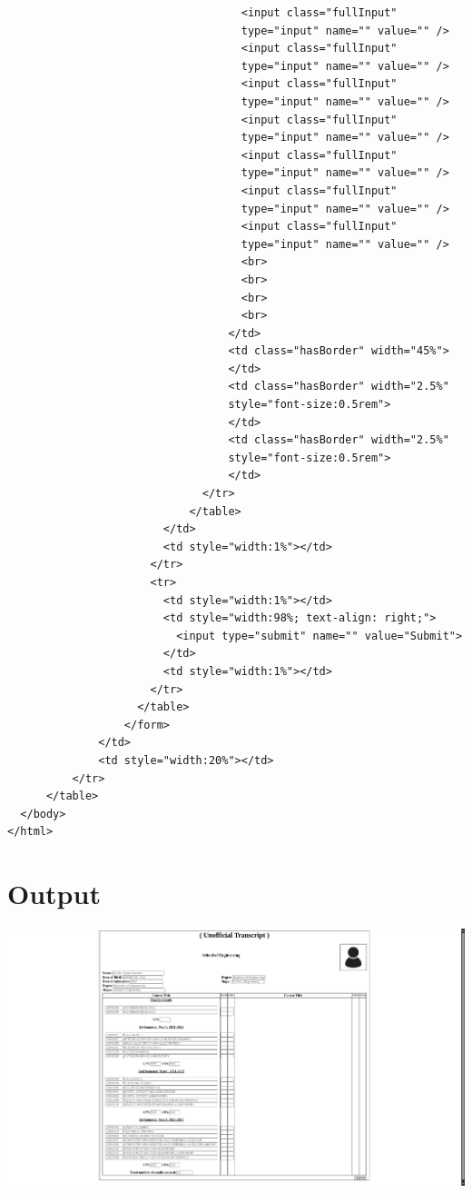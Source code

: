 \documentclass[12pt]{report} %
\begin{document}
\begin{verbatim}
                                    <input class="fullInput"
                                    type="input" name="" value="" />
                                    <input class="fullInput"
                                    type="input" name="" value="" />
                                    <input class="fullInput"
                                    type="input" name="" value="" />
                                    <input class="fullInput"
                                    type="input" name="" value="" />
                                    <input class="fullInput"
                                    type="input" name="" value="" />
                                    <input class="fullInput"
                                    type="input" name="" value="" />
                                    <input class="fullInput"
                                    type="input" name="" value="" />
                                    <br>
                                    <br>
                                    <br>
                                    <br>
                                  </td>
                                  <td class="hasBorder" width="45%">
                                  </td>
                                  <td class="hasBorder" width="2.5%"
                                  style="font-size:0.5rem">
                                  </td>
                                  <td class="hasBorder" width="2.5%"
                                  style="font-size:0.5rem">
                                  </td>
                              </tr>
                            </table>
                        </td>
                        <td style="width:1%"></td>
                      </tr>
                      <tr>
                        <td style="width:1%"></td>
                        <td style="width:98%; text-align: right;">
                          <input type="submit" name="" value="Submit">
                        </td>
                        <td style="width:1%"></td>
                      </tr>
                    </table>
                  </form>
              </td>
              <td style="width:20%"></td>
          </tr>
      </table>
  </body>
</html>
\end{verbatim}

\section*{Output}


	  \includegraphics[width=15cm]{../Output.png} %
\end{document}
